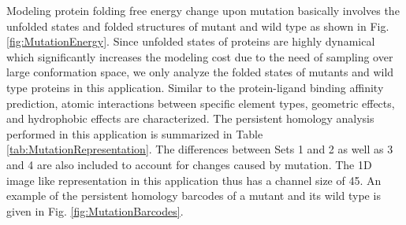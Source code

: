 \documentclass[10pt]{article}
\begin{document}



Modeling protein folding free energy change upon mutation basically involves the unfolded states and folded structures of mutant and wild type as shown in Fig. \ref{fig:MutationEnergy}. Since unfolded states of proteins are highly dynamical which significantly increases the modeling cost due to the need of sampling over large conformation space, we only analyze the folded states of mutants and wild type proteins in this application. Similar to the protein-ligand binding affinity prediction, atomic interactions between specific element types, geometric effects, and hydrophobic effects are characterized. The persistent homology analysis performed in this application is summarized in Table \ref{tab:MutationRepresentation}. The differences between Sets 1 and 2 as well as 3 and 4 are also included to account for changes caused by mutation. The 1D image like representation in this application thus has a channel size of 45. An example of the persistent homology barcodes of a mutant and its wild type is given in Fig.  \ref{fig:MutationBarcodes}.
\end{document}
